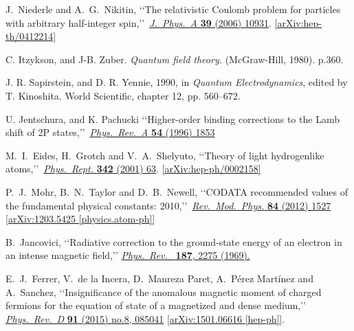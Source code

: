 \documentclass[epj]{svjour}
\begin{document}
\begin{thebibliography}{99}
 J.~Niederle and A.~G.~Nikitin,
 \lq\lq The relativistic Coulomb problem for particles with arbitrary half-integer spin,\rq\rq\ 
 \href{https://doi.org/10.1088/0305-4470/39/34/023}{\emph{J.\ Phys.\ A} {\bf 39} (2006) 10931}.
 \href{https://arxiv.org/abs/hep-th/0412214}{[arXiv:hep-th/0412214]}

 C. Itzykson, and J-B. Zuber. 
 \emph{Quantum field theory.} 
 (McGraw-Hill, 1980). p.360.
 

 J. R. Sapirstein, and D. R. Yennie, 1990, in \emph{Quantum Electrodynamics},
 edited by T. Kinoshita. World Scientific, chapter 12, pp. 560–672.

 U. Jentschura, and K. Pachucki 
 \lq\lq Higher-order binding corrections to the Lamb shift of 2P states,\rq\rq\ 
\href{https://doi.org/10.1103/PhysRevA.54.1853}{\emph{Phys.\ Rev.\ A} {\bf 54} (1996) 1853}
 
 M.~I.~Eides, H.~Grotch and V.~A.~Shelyuto, 
 \lq\lq Theory of light hydrogenlike atoms,\rq\rq\ 
 \href{https://doi.org/10.1016/S0370-1573(00)00077-6}{\emph{Phys.\ Rept.} {\bf 342} (2001) 63}.
 \href{https://arxiv.org/abs/hep-ph/0002158}{[arXiv:hep-ph/0002158]}


 P.~J.~Mohr, B.~N.~Taylor and D.~B.~Newell, 
 \lq\lq CODATA recommended values of the fundamental physical constants: 2010,\rq\rq\ 
 \href{https://doi.org/10.1103/RevModPhys.84.1527}{\emph{Rev.\ Mod.\ Phys.} {\bf 84} (2012) 1527}
 \href{https://arxiv.org/abs/1203.5425}{[arXiv:1203.5425 [physics.atom-ph]]}

\bibitem{Jancovici:1970ep} 
 B.~Jancovici,
 \lq\lq Radiative correction to the ground-state energy of an electron in an intense magnetic field,\rq\rq
 \href{https://doi.org/10.1103/PhysRev.187.2275}{\emph{Phys.\ Rev.\ } {\bf 187}, 2275 (1969).}

\bibitem{Ferrer:2015wca}
 E.~J.~Ferrer, V.~de la Incera, D.~Manreza Paret, A.~Pérez Martínez and A.~Sanchez,
 \lq\lq Insignificance of the anomalous magnetic moment of charged fermions for the equation of state of a magnetized and dense medium,\rq\rq
 \href{https://doi.org/10.1103/PhysRevD.91.085041}{\emph{Phys.\ Rev.\ D} {\bf 91} (2015) no.8, 085041}
 \href{https://arxiv.org/abs/1501.06616}{[arXiv:1501.06616 [hep-ph]]}.


\end{thebibliography}
\end{document}
